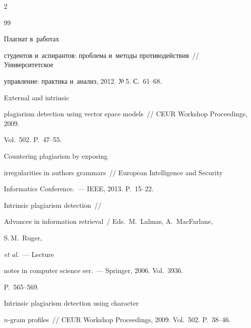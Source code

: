 \begin{multicols}{2}
{{ \begin{thebibliography}{99}


   Плагиат в~работах 

студентов и~аспирантов: проблема и~методы противодействия~// Университетское 

управление: практика и~анализ, 2012. №\,5. С.~61--68.




 External and intrinsic 

plagiarism detection using vector space models~// CEUR Workshop Proceedings, 2009. 

Vol.~502. P.~47--55.




   Countering plagiarism by exposing 

irregularities in authors grammars~// European Intelligence and Security 

Informatics Conference.~--- IEEE, 2013. P.~15--22.








 Intrinsic plagiarism detection~// 

Advances in information retrieval~/ Eds.\ M.~Lalmas, A.~MacFarlane, 

S.\,M.~R$\ddot{\mbox{u}}$ger,

\textit{et al.}~--- Lecture 

notes in computer science ser.~--- Springer, 2006. Vol.~3936. 

P.~565--569.




 Intrinsic plagiarism detection using character 

$n$-gram profiles~// CEUR Workshop Proceedings, 2009. Vol.~502. P.~38--46.






\end{thebibliography}}}
\end{multicols}
